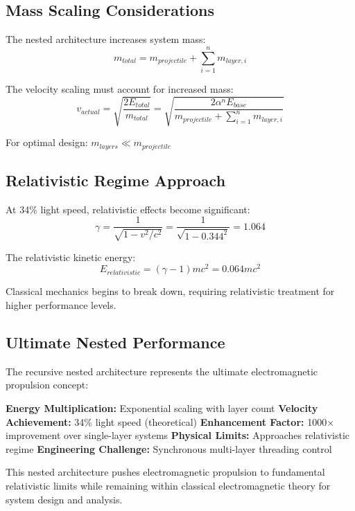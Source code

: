 \documentclass[12pt,a4paper]{article}
\begin{document}
\subsection{Mass Scaling Considerations}

The nested architecture increases system mass:
\begin{equation}
m_{total} = m_{projectile} + \sum_{i=1}^{n} m_{layer,i}
\end{equation}

The velocity scaling must account for increased mass:
\begin{equation}
v_{actual} = \sqrt{\frac{2E_{total}}{m_{total}}} = \sqrt{\frac{2\alpha^n E_{base}}{m_{projectile} + \sum_{i=1}^{n} m_{layer,i}}}
\end{equation}

For optimal design: $m_{layers} \ll m_{projectile}$

\subsection{Relativistic Regime Approach}

At 34\% light speed, relativistic effects become significant:
\begin{equation}
\gamma = \frac{1}{\sqrt{1-v^2/c^2}} = \frac{1}{\sqrt{1-0.344^2}} = 1.064
\end{equation}

The relativistic kinetic energy:
\begin{equation}
E_{relativistic} = (\gamma - 1)mc^2 = 0.064mc^2
\end{equation}

Classical mechanics begins to break down, requiring relativistic treatment for higher performance levels.

\subsection{Ultimate Nested Performance}

The recursive nested architecture represents the ultimate electromagnetic propulsion concept:

\textbf{Energy Multiplication:} Exponential scaling with layer count
\textbf{Velocity Achievement:} 34\% light speed (theoretical)
\textbf{Enhancement Factor:} 1000× improvement over single-layer systems
\textbf{Physical Limits:} Approaches relativistic regime
\textbf{Engineering Challenge:} Synchronous multi-layer threading control

This nested architecture pushes electromagnetic propulsion to fundamental relativistic limits while remaining within classical electromagnetic theory for system design and analysis.
\end{document}
